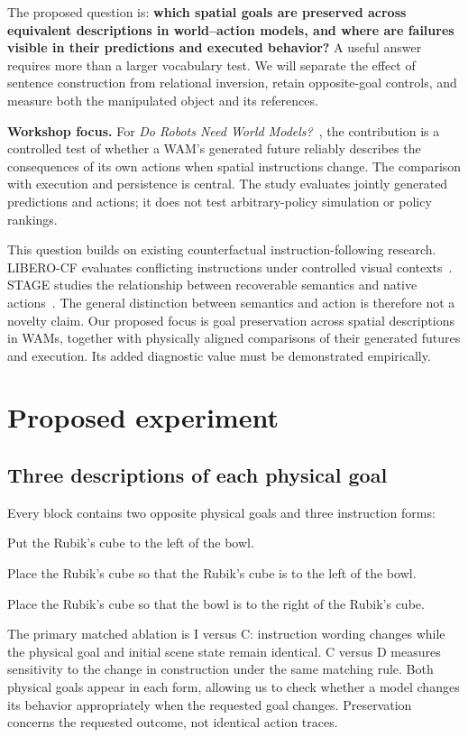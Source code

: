 \documentclass[11pt]{article}
\begin{document}
The proposed question is: \textbf{which spatial goals are preserved across equivalent descriptions in world--action models, and where are failures visible in their predictions and executed behavior?} A useful answer requires more than a larger vocabulary test. We will separate the effect of sentence construction from relational inversion, retain opposite-goal controls, and measure both the manipulated object and its references.

\textbf{Workshop focus.} For \emph{Do Robots Need World Models?}~\cite{workshop}, the contribution is a controlled test of whether a WAM's generated future reliably describes the consequences of its own actions when spatial instructions change. The comparison with execution and persistence is central. The study evaluates jointly generated predictions and actions; it does not test arbitrary-policy simulation or policy rankings.

This question builds on existing counterfactual instruction-following research. LIBERO-CF evaluates conflicting instructions under controlled visual contexts~\cite{liberocf}. STAGE studies the relationship between recoverable semantics and native actions~\cite{stage}. The general distinction between semantics and action is therefore not a novelty claim. Our proposed focus is goal preservation across spatial descriptions in WAMs, together with physically aligned comparisons of their generated futures and execution. Its added diagnostic value must be demonstrated empirically.

\section{Proposed experiment}
\subsection{Three descriptions of each physical goal}
Every block contains two opposite physical goals and three instruction forms:
\begin{description}[font=\normalfont\bfseries]
\item[D: direct.] Put the Rubik's cube to the left of the bowl.
\item[C: subject-first clause.] Place the Rubik's cube so that the Rubik's cube is to the left of the bowl.
\item[I: inverted clause.] Place the Rubik's cube so that the bowl is to the right of the Rubik's cube.
\end{description}
The primary matched ablation is I versus C: instruction wording changes while the physical goal and initial scene state remain identical. C versus D measures sensitivity to the change in construction under the same matching rule. Both physical goals appear in each form, allowing us to check whether a model changes its behavior appropriately when the requested goal changes. Preservation concerns the requested outcome, not identical action traces.
\end{document}

